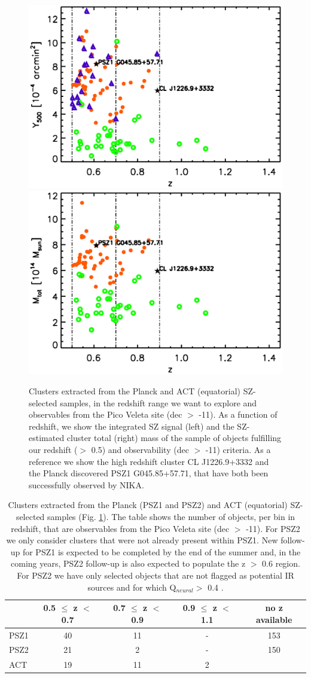 \documentclass[11pt,a4paper,twoside,graphicx,color]{article}
\begin{document}
\begin{figure}
  \centering
   \includegraphics[width=0.48\columnwidth]{./Figures/NIKA2_cl_sample_Y.eps}
   \includegraphics[width=0.48\columnwidth]{./Figures/NIKA2_cl_sample_M.eps}
\caption{Clusters extracted from the Planck and ACT (equatorial) SZ-selected samples, in the redshift range we want to explore and observables from the Pico Veleta site (dec $>$ -11). As a function of redshift, we show the integrated SZ signal (left) and the SZ-estimated cluster total (right) mass of the sample of objects fulfilling our redshift ($>$ 0.5) and observability (dec $>$ -11) criteria. As a reference we show the high redshift cluster CL J1226.9+3332 and the Planck discovered PSZ1 G045.85+57.71, that have both been successfully observed by NIKA.}
\label{Fig:sample}
\end{figure}

\begin{table}
\centering
\begin{tabular}{|l  || c | c | c || c |}           
 \hline    
  &  0.5 $\leq$ z $<$ 0.7  & 0.7 $\leq$ z $<$ 0.9 & 0.9 $\leq$ z $<$ 1.1 & no z available\\ \hline
  PSZ1 & 40 & 11 & - & 153 \\  \hline 
  PSZ2 & 21 & 2 & - & 150 \\  \hline
  ACT & 19 & 11 & 2 & \\  \hline
\end{tabular}
\label{tab:sample}
 \caption{Clusters extracted from the Planck (PSZ1 and PSZ2) and ACT (equatorial) SZ-selected samples (Fig. \ref{Fig:sample}). The table shows the number of objects, per bin in redshift, that are observables from the Pico Veleta site (dec $>$ -11). For PSZ2 we only consider clusters that were not already present within PSZ1. New follow-up for PSZ1 is expected to be completed by the end of the summer and, in the coming years, PSZ2 follow-up is also expected to populate the z $>$ 0.6 region. For PSZ2 we have only selected objects that are not flagged as potential IR sources and for which Q$_{neural} >$ 0.4 \citep{PSZ2, Aghanim2014}.}
\end{table} 
\end{document}
